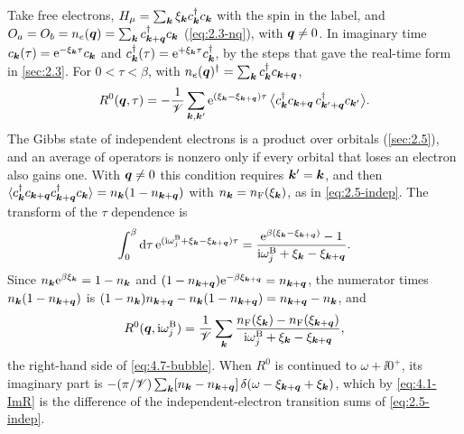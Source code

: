 Take free electrons, $H_\mu = \sum_{\bm{k}}\xi_{\bm{k}}c^\dagger_{\bm{k}}c_{\bm{k}}$ with the spin in the label, and $O_a = O_b = n_e(\bm{q}) = \sum_{\bm{k}}c^\dagger_{\bm{k}+\bm{q}}c_{\bm{k}}$ (\cref{eq:2.3-nq}), with $\bm{q} \ne 0$. In imaginary time $c_{\bm{k}}(\tau) = \mathrm{e}^{-\xi_{\bm{k}}\tau}c_{\bm{k}}$ and $c^\dagger_{\bm{k}}(\tau) = \mathrm{e}^{+\xi_{\bm{k}}\tau}c^\dagger_{\bm{k}}$, by the steps that gave the real-time form in \cref{sec:2.3}. For $0 < \tau < \beta$, with $n_e(\bm{q})^\dagger = \sum_{\bm{k}}c^\dagger_{\bm{k}}c_{\bm{k}+\bm{q}}$,
\begin{equation*}
  R^0(\bm{q},\tau) = -\frac{1}{\mathscr{V}}\sum_{\bm{k},\bm{k}'}\mathrm{e}^{(\xi_{\bm{k}} - \xi_{\bm{k}+\bm{q}})\tau}\,\bigl\langle c^\dagger_{\bm{k}}c_{\bm{k}+\bm{q}}\,c^\dagger_{\bm{k}'+\bm{q}}c_{\bm{k}'}\bigr\rangle .
\end{equation*}
The Gibbs state of independent electrons is a product over orbitals (\cref{sec:2.5}), and an average of operators is nonzero only if every orbital that loses an electron also gains one. With $\bm{q} \ne 0$ this condition requires $\bm{k}' = \bm{k}$, and then $\langle c^\dagger_{\bm{k}}c_{\bm{k}+\bm{q}}c^\dagger_{\bm{k}+\bm{q}}c_{\bm{k}}\rangle = n_{\bm{k}}(1 - n_{\bm{k}+\bm{q}})$ with $n_{\bm{k}} = n_{\mathrm{F}}(\xi_{\bm{k}})$, as in \cref{eq:2.5-indep}. The transform of the $\tau$ dependence is
\begin{equation*}
  \int_0^\beta\mathrm{d}\tau\,\mathrm{e}^{(\mathrm{i}\omega^{\mathrm{B}}_j + \xi_{\bm{k}} - \xi_{\bm{k}+\bm{q}})\tau} = \frac{\mathrm{e}^{\beta(\xi_{\bm{k}} - \xi_{\bm{k}+\bm{q}})} - 1}{\mathrm{i}\omega^{\mathrm{B}}_j + \xi_{\bm{k}} - \xi_{\bm{k}+\bm{q}}} .
\end{equation*}
Since $n_{\bm{k}}\mathrm{e}^{\beta\xi_{\bm{k}}} = 1 - n_{\bm{k}}$ and $(1 - n_{\bm{k}+\bm{q}})\mathrm{e}^{-\beta\xi_{\bm{k}+\bm{q}}} = n_{\bm{k}+\bm{q}}$, the numerator times $n_{\bm{k}}(1 - n_{\bm{k}+\bm{q}})$ is $(1 - n_{\bm{k}})n_{\bm{k}+\bm{q}} - n_{\bm{k}}(1 - n_{\bm{k}+\bm{q}}) = n_{\bm{k}+\bm{q}} - n_{\bm{k}}$, and
\begin{equation}
  R^0(\bm{q},\mathrm{i}\omega^{\mathrm{B}}_j) = \frac{1}{\mathscr{V}}\sum_{\bm{k}}\frac{n_{\mathrm{F}}(\xi_{\bm{k}}) - n_{\mathrm{F}}(\xi_{\bm{k}+\bm{q}})}{\mathrm{i}\omega^{\mathrm{B}}_j + \xi_{\bm{k}} - \xi_{\bm{k}+\bm{q}}} ,
  \label{eq:D.10-R0}
\end{equation}
the right-hand side of \cref{eq:4.7-bubble}. When $R^0$ is continued to $\omega + \ii0^+$, its imaginary part is $-(\pi/\mathscr{V})\sum_{\bm{k}}[n_{\bm{k}} - n_{\bm{k}+\bm{q}}]\,\delta(\omega - \xi_{\bm{k}+\bm{q}} + \xi_{\bm{k}})$, which by \cref{eq:4.1-ImR} is the difference of the independent-electron transition sums of \cref{eq:2.5-indep}.


